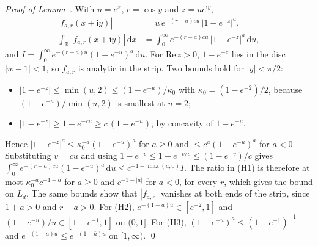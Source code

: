 \emph{Proof of Lemma~.} With $u=e^x$, $c=\cos y$ and $z=ue^{\mathrm iy}$,
\[
\begin{aligned}
|f_{a,r}(x+\mathrm iy)|&=u\,e^{-(r-a)cu}\,|1-e^{-z}|^{a},\\
\int_{\mathbb R}|f_{a,r}(x+\mathrm iy)|\,\mathrm dx&=\int_0^\infty e^{-(r-a)cu}\,|1-e^{-z}|^{a}\,\mathrm du,
\end{aligned}
\]
and $I=\int_0^\infty e^{-(r-a)u}(1-e^{-u})^a\,\mathrm du$. For $\mathrm{Re}\,z>0$, $1-e^{-z}$ lies in the disc $|w-1|<1$, so $f_{a,r}$ is analytic in the strip. Two bounds hold for $|y|<\pi/2$:
\begin{itemize}
\item $|1-e^{-z}|\le\min(u,2)\le(1-e^{-u})/\kappa_0$ with $\kappa_0=(1-e^{-2})/2$, because $(1-e^{-u})/\min(u,2)$ is smallest at $u=2$;
\item $|1-e^{-z}|\ge1-e^{-cu}\ge c\,(1-e^{-u})$, by concavity of $1-e^{-u}$.
\end{itemize}
Hence $|1-e^{-z}|^a\le\kappa_0^{-a}(1-e^{-u})^a$ for $a\ge0$ and $\le c^{a}(1-e^{-u})^a$ for $a<0$. Substituting $v=cu$ and using $1-e^{-v}\le1-e^{-v/c}\le(1-e^{-v})/c$ gives $\int_0^\infty e^{-(r-a)cu}(1-e^{-u})^a\,\mathrm du\le c^{-1-\max(a,0)}I$. The ratio in (H1) is therefore at most $\kappa_0^{-a}c^{-1-a}$ for $a\ge0$ and $c^{-1-|a|}$ for $a<0$, for every $r$, which gives the bound on $L_d$. The same bounds show that $|f_{a,r}|$ vanishes at both ends of the strip, since $1+a>0$ and $r-a>0$. For (H2), $e^{-(1-a)u}\in[e^{-2},1]$ and $(1-e^{-u})/u\in[1-e^{-1},1]$ on $(0,1]$. For (H3), $(1-e^{-u})^a\le(1-e^{-1})^{-1}$ and $e^{-(1-a)u}\le e^{-(1-\bar a)u}$ on $[1,\infty)$. \qed


